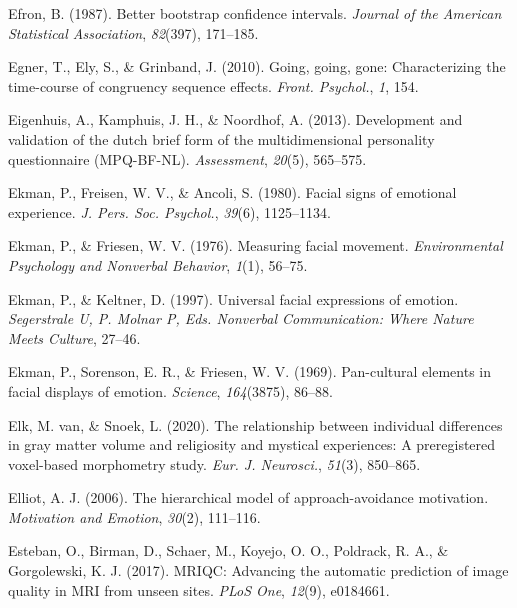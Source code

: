 \documentclass[11pt,american,a4paper,oneside,]{memoir} %
\begin{document}
\leavevmode\hypertarget{ref-efron1987better}{}%
Efron, B. (1987). Better bootstrap confidence intervals. \emph{Journal of the American Statistical Association}, \emph{82}(397), 171--185.

\leavevmode\hypertarget{ref-Egner2010-ot}{}%
Egner, T., Ely, S., \& Grinband, J. (2010). Going, going, gone: Characterizing the time-course of congruency sequence effects. \emph{Front. Psychol.}, \emph{1}, 154.

\leavevmode\hypertarget{ref-Eigenhuis2013-xo}{}%
Eigenhuis, A., Kamphuis, J. H., \& Noordhof, A. (2013). Development and validation of the dutch brief form of the multidimensional personality questionnaire (MPQ-BF-NL). \emph{Assessment}, \emph{20}(5), 565--575.

\leavevmode\hypertarget{ref-Ekman1980-of}{}%
Ekman, P., Freisen, W. V., \& Ancoli, S. (1980). Facial signs of emotional experience. \emph{J. Pers. Soc. Psychol.}, \emph{39}(6), 1125--1134.

\leavevmode\hypertarget{ref-Ekman1976-hm}{}%
Ekman, P., \& Friesen, W. V. (1976). Measuring facial movement. \emph{Environmental Psychology and Nonverbal Behavior}, \emph{1}(1), 56--75.

\leavevmode\hypertarget{ref-Ekman1997-bk}{}%
Ekman, P., \& Keltner, D. (1997). Universal facial expressions of emotion. \emph{Segerstrale U, P. Molnar P, Eds. Nonverbal Communication: Where Nature Meets Culture}, 27--46.

\leavevmode\hypertarget{ref-Ekman1969-pu}{}%
Ekman, P., Sorenson, E. R., \& Friesen, W. V. (1969). Pan-cultural elements in facial displays of emotion. \emph{Science}, \emph{164}(3875), 86--88.

\leavevmode\hypertarget{ref-Van_Elk2020-xo}{}%
Elk, M. van, \& Snoek, L. (2020). The relationship between individual differences in gray matter volume and religiosity and mystical experiences: A preregistered voxel-based morphometry study. \emph{Eur. J. Neurosci.}, \emph{51}(3), 850--865.

\leavevmode\hypertarget{ref-elliot2006hierarchical}{}%
Elliot, A. J. (2006). The hierarchical model of approach-avoidance motivation. \emph{Motivation and Emotion}, \emph{30}(2), 111--116.

\leavevmode\hypertarget{ref-Esteban2017-mv}{}%
Esteban, O., Birman, D., Schaer, M., Koyejo, O. O., Poldrack, R. A., \& Gorgolewski, K. J. (2017). MRIQC: Advancing the automatic prediction of image quality in MRI from unseen sites. \emph{PLoS One}, \emph{12}(9), e0184661.
\end{document}
